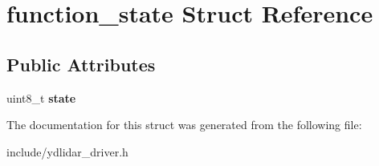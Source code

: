 \hypertarget{structfunction__state}{}\section{function\+\_\+state Struct Reference}
\label{structfunction__state}
\subsection*{Public Attributes}
\begin{DoxyCompactItemize}
\item 
uint8\+\_\+t {\bfseries state}\hypertarget{structfunction__state_a87e57090eb56985ddb9b22fed035209d}{}\label{structfunction__state_a87e57090eb56985ddb9b22fed035209d}

\end{DoxyCompactItemize}


The documentation for this struct was generated from the following file\+:\begin{DoxyCompactItemize}
\item 
include/ydlidar\+\_\+driver.\+h\end{DoxyCompactItemize}
